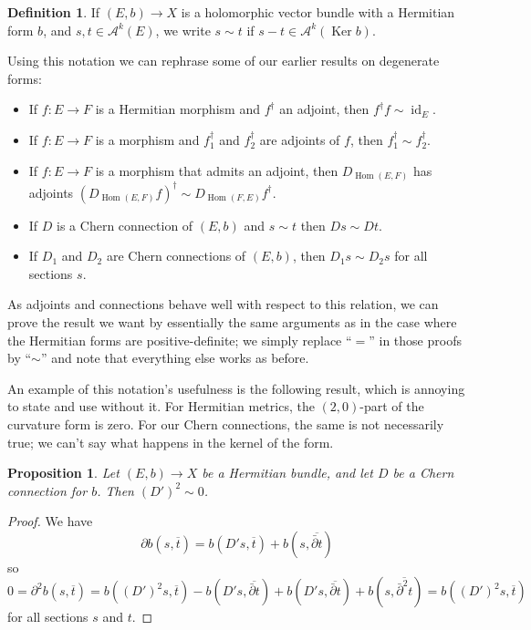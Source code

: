 \documentclass[10pt,a4paper]{amsart}
\newtheorem{prop}[theo]{Proposition}
\theoremstyle{definition}
\newtheorem{defi}[theo]{Definition}
\newcommand{\cc}[1]{\mathcal{#1}}
\def\ov#1{\overline{#1}}
\DeclareMathOperator{\Ker}{Ker}
\DeclareMathOperator{\Hom}{Hom}
\DeclareMathOperator{\id}{id}
\begin{document}
\begin{defi}
If $(E, b) \to X$ is a holomorphic vector bundle with a Hermitian form $b$, and $s, t \in \cc A^k(E)$, we write
\(
s \sim t
\)
if $s - t \in \cc A^k(\Ker b)$.
\end{defi}

Using this notation we can rephrase some of our earlier results on degenerate forms:
\begin{itemize}
\item
If $f : E \to F$ is a Hermitian morphism and $f^\dagger$ an adjoint, then $f^\dagger f \sim \id_E$.

\item
If $f : E \to F$ is a morphism and $f_1^\dagger$ and $f_2^\dagger$ are adjoints of $f$, then $f_1^\dagger \sim f_2^\dagger$.

\item
If $f : E \to F$ is a morphism that admits an adjoint, then $D_{\Hom(E,F)}$ has adjoints $(D_{\Hom(E,F)}f)^\dagger \sim D_{\Hom(F,E)}f^\dagger$.

\item
If $D$ is a Chern connection of $(E,b)$ and $s \sim t$ then $Ds \sim Dt$.

\item
If $D_1$ and $D_2$ are Chern connections of $(E,b)$, then $D_1s \sim D_2s$ for all sections $s$.
\end{itemize}
As adjoints and connections behave well with respect to this relation, we can prove the result we want by essentially the same arguments as in the case where the Hermitian forms are positive-definite; we simply replace ``$=$'' in those proofs by ``$\sim$'' and note that everything else works as before.

An example of this notation's usefulness is the following result, which is annoying to state and use without it. For Hermitian metrics, the $(2,0)$-part of the curvature form is zero. For our Chern connections, the same is not necessarily true; we can't say what happens in the kernel of the form.

\begin{prop}
Let $(E, b) \to X$ be a Hermitian bundle, and let $D$ be a Chern connection for $b$. Then $(D')^2 \sim 0$.
\end{prop}

\begin{proof}
We have
\[
\partial b(s, \ov t)
= b(D's, \ov t) + b(s, \ov{\bar\partial t})
\]
so
\[
0 = \partial^2 b(s, \ov t)
= b((D')^2s, \ov t)
- b(D's, \ov{\bar\partial t})
+ b(D's, \ov{\bar\partial t})
+ b(s, \ov{\bar\partial^2 t})
= b((D')^2s, \ov t)
\]
for all sections $s$ and $t$.
\end{proof}
\end{document}
